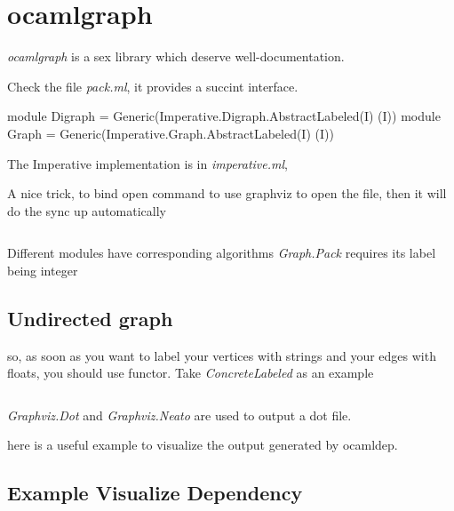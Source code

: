 \section{ocamlgraph}
\label{sec:ocamlgraph}

\textit{ocamlgraph} is a sex library which deserve well-documentation.

Check the file \textit{pack.ml}, it provides a succint interface.

\begin{ocamlcode}
  module Digraph = Generic(Imperative.Digraph.AbstractLabeled(I) (I))
  module Graph = Generic(Imperative.Graph.AbstractLabeled(I) (I))
\end{ocamlcode}

The Imperative implementation is in \textit{imperative.ml}, 

A nice trick, to bind open command to use graphviz to open the file,
then it will do the sync up automatically

\inputminted[fontsize=\scriptsize
]{ocaml}{code/graph/dag.ml}

Different modules have corresponding algorithms
\textit{Graph.Pack} requires its label being integer 



\subsection{Undirected graph}
\label{sec:undirected-graph}

so, as soon as you want to label your vertices with strings and your
edges with floats, you should use functor. Take
\textit{ConcreteLabeled} as an example


\inputminted[fontsize=\scriptsize
]{ocaml}{code/graph/concrete.ml}

\textit{Graphviz.Dot} and \textit{Graphviz.Neato} are used to output a
dot file.


here is a useful example to visualize the output generated by ocamldep.

\subsection{Example Visualize Dependency}
\label{sec:Visualize}

\inputminted[fontsize=\scriptsize
]{ocaml}{code/graph/dep.ml}






